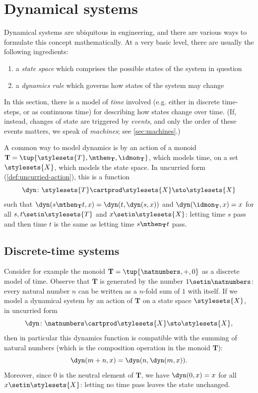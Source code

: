 

\section{Dynamical systems}
\label{sec:dynamical-systems}

Dynamical systems are ubiquitous in engineering, and there are various ways to formulate this concept mathematically.
At a very basic level, there are usually the following ingredients:
\begin{enumerate}
    \item a \emph{state space} which comprises the possible states of the system in question
    \item a \emph{dynamics rule} which governs how states of the system may change
\end{enumerate}
In this section, there is a model of \emph{time} involved (e.g. either in discrete time-steps, or as continuous time) for describing how states change over time.
(If, instead, changes of state are triggered by \emph{events}, and only the order of these events matters, we speak of \emph{machines}; see \cref{sec:machines}.)

A common way to model dynamics is by an action of a monoid $\mathbf{T} = \tup{\stylesets{T}, \mthen_{\mathbf{T}}, \idmon_{\mathbf{T}}}$, which models time, on a set $\stylesets{X}$, which models the state space.
In uncurried form (\cref{def:uncurried-action}), this is a function
\begin{equation}
    \dyn \colon  \stylesets{T} \cartprod \stylesets{X} \sto \stylesets{X}
\end{equation}
such that $\dyn(s \mthen_{\mathbf{T}} t, x) = \dyn(t, \dyn(s, x))$ and $\dyn(\idmon_{\mathbf{T}}, x) = x$ for all $s, t \setin \stylesets{T}$ and $x \setin \stylesets{X}$: letting time $s$ pass and then time $t$ is the same as letting time $s \mthen_{\mathbf{T}} t$ pass.


\subsection{Discrete-time systems}

Consider for example the monoid $\mathbf{T} = \tup{\natnumbers, +, 0}$ as a discrete model of time.
Observe that $\mathbf{T}$ is generated by the number $1 \setin \natnumbers$: every natural number $n$ can be written as a $n$-fold sum of $1$ with itself.
If we model a dynamical system by an action of $\mathbf{T}$ on a state space $\stylesets{X}$, in uncurried form
\begin{equation}\label{eq:discrete-time-dynamics}
    \dyn \colon  \natnumbers \cartprod \stylesets{X}   \sto \stylesets{X},
\end{equation}
then in particular this dynamics function is compatible with the summing of natural numbers (which is the composition operation in the monoid $\mathbf{T}$):
\begin{equation}
    \dyn(m + n, x) = \dyn(n, \dyn(m, x)).
\end{equation}
Moreover, since $0$ is the neutral element of $\mathbf{T}$, we have $\dyn(0, x) = x$ for all $x \setin \stylesets{X}$: letting no time pass leaves the state unchanged.


